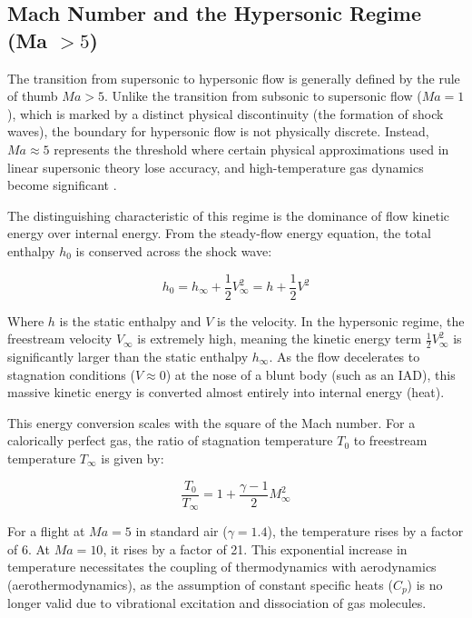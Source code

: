 \subsection{Mach Number and the Hypersonic Regime (\texorpdfstring{Ma $> 5$}{Ma > 5})}

The transition from supersonic to hypersonic flow is generally defined by the rule of thumb $Ma > 5$. Unlike the transition from subsonic to supersonic flow ($Ma = 1$), which is marked by a distinct physical discontinuity (the formation of shock waves), the boundary for hypersonic flow is not physically discrete. Instead, $Ma \approx 5$ represents the threshold where certain physical approximations used in linear supersonic theory lose accuracy, and high-temperature gas dynamics become significant \cite{AndersonHypersonic}.
\par

The distinguishing characteristic of this regime is the dominance of flow kinetic energy over internal energy. From the steady-flow energy equation, the total enthalpy $h_0$ is conserved across the shock wave:

\begin{equation}
    h_0 = h_{\infty} + \frac{1}{2}V_{\infty}^2 = h + \frac{1}{2}V^2
\end{equation}

Where $h$ is the static enthalpy and $V$ is the velocity. In the hypersonic regime, the freestream velocity $V_{\infty}$ is extremely high, meaning the kinetic energy term $\frac{1}{2}V_{\infty}^2$ is significantly larger than the static enthalpy $h_{\infty}$. As the flow decelerates to stagnation conditions ($V \approx 0$) at the nose of a blunt body (such as an IAD), this massive kinetic energy is converted almost entirely into internal energy (heat).
\par
This energy conversion scales with the square of the Mach number. For a calorically perfect gas, the ratio of stagnation temperature $T_0$ to freestream temperature $T_{\infty}$ is given by:

\begin{equation}
    \frac{T_0}{T_{\infty}} = 1 + \frac{\gamma - 1}{2} M_{\infty}^2
\end{equation}
\par
For a flight at $Ma = 5$ in standard air ($\gamma = 1.4$), the temperature rises by a factor of 6. At $Ma = 10$, it rises by a factor of 21. This exponential increase in temperature necessitates the coupling of thermodynamics with aerodynamics (aerothermodynamics), as the assumption of constant specific heats ($C_p$) is no longer valid due to vibrational excitation and dissociation of gas molecules.

